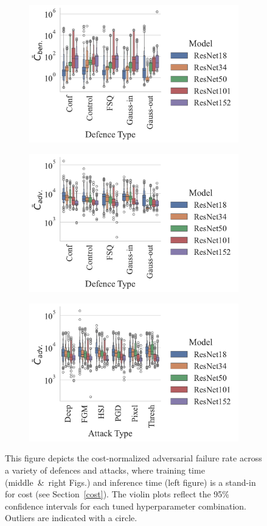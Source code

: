 \begin{figure}[!h]
    \centering
    \begin{subfigure}
        \centering
        \includegraphics[width=.45\textwidth]{plots/ben_failures_per_train_time_vs_defence_type.pdf}
    \end{subfigure}
    \begin{subfigure}
        \centering
        \includegraphics[width=.45\textwidth]{plots/adv_failures_per_train_time_vs_defence_type.pdf}
    \end{subfigure}
    \begin{subfigure}
        \centering
        \includegraphics[width=.45\textwidth]{plots/adv_failures_per_train_time_vs_attack_type.pdf}
    \end{subfigure}
    \caption{This figure depicts the cost-normalized adversarial failure rate across a variety of defences and attacks, where training time (middle~\&~right Figs.) and inference time (left figure) is a stand-in for cost (see Section~\ref{cost}). The violin plots reflect the 95\% confidence intervals for each tuned hyperparameter combination. Outliers are indicated with a circle.}
    \label{fig:failures_per_train_time}
\end{figure}



